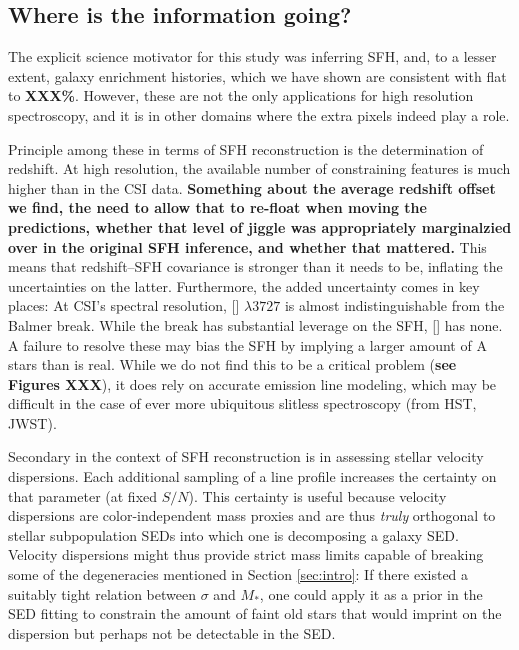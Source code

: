 \documentclass[a4paper,fleqn,usenatbib]{mnras}
\newcommand{\Mstel}{M_\ast}
\newcommand{\bfr}{\bf\color{red}}
\begin{document}
\subsection{Where is the information going?}
\label{sec:redshifts}

The explicit science motivator for this study was inferring SFH, and, to a lesser extent, galaxy 
enrichment histories, which we have shown are consistent with flat to {\bfr XXX\%}. However, 
these are not the only applications for high resolution spectroscopy, and it is in other domains 
where the extra pixels indeed play a role.

Principle among these in terms of SFH reconstruction is the determination of redshift. At high 
resolution, the available number
of constraining features is much higher than in the CSI data. {\bfr Something about the average
redshift offset we find, the need to allow that to re-float when moving the predictions, whether
that level of jiggle was appropriately marginalzied over in the original SFH inference, and whether
that mattered.} This means that redshift--SFH covariance is stronger than it needs to be, inflating 
the uncertainties on the latter. Furthermore, the added uncertainty comes in key places: At CSI's 
spectral resolution, [] $\lambda 3727$ is almost indistinguishable from the Balmer break. 
While the break has substantial leverage on the SFH, [] has none. A failure to resolve these 
may bias the SFH by implying a larger amount of A stars than is real. While we do not find this to 
be a critical problem ({\bfr see Figures XXX}), it does rely on accurate emission line modeling, 
which may be difficult in the case of ever more ubiquitous slitless spectroscopy (from HST, JWST). 

Secondary in the context of SFH reconstruction is in assessing stellar velocity dispersions. Each 
additional sampling of a line profile increases the certainty on that parameter (at fixed $S/N$). 
This certainty is useful because velocity dispersions are color-independent mass proxies and are 
thus {\it truly} orthogonal to stellar subpopulation SEDs into which one is decomposing a galaxy SED.
Velocity dispersions might thus provide strict mass limits capable of breaking some of the degeneracies 
mentioned in Section \ref{sec:intro}: If there existed a suitably tight relation between $\sigma$
and $\Mstel$, one could apply it as a prior in the SED fitting to constrain the amount of faint old 
stars that would imprint on the dispersion but perhaps not be detectable in the SED.
\end{document}
